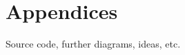 %
%
%

\chapter*{Appendices}
Source code, further diagrams, ideas, etc.


\backmatter

\def\baselinestretch{1.24}\normalfont





